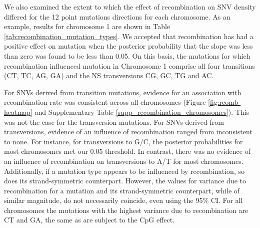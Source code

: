 We also examined the extent to which the effect of recombination on SNV density differed for the 12 point mutations directions for each chromosome. As an example, results for chromosome 1 are shown in Table \ref{tab:recombination_mutation_types}. We accepted that recombination has had a positive effect on mutation when the posterior probability that the slope was less than zero was found to be less than 0.05. On this basis, the mutations for which recombination influenced mutation in Chromosome 1 comprise all four transitions 
(C\textrightarrow T, T\textrightarrow C, A\textrightarrow G, G\textrightarrow A) and the N\textrightarrow S transversions C\textrightarrow G, G\textrightarrow C, T\textrightarrow G and A\textrightarrow C.

For SNVs derived from transition mutations, evidence for an association with recombination rate was consistent across all chromosomes (Figure \ref{fig:rcomb-heatmap} and Supplementary Table \ref{supp_recombination_chromosomes}). This was not the case for the transversion mutations. For SNVs derived from transversions, evidence of an influence of recombination ranged from inconsistent to none. For instance, for transversions to G/C, the posterior probabilities for most chromosomes met our 0.05 threshold. In contrast, there was no evidence of an influence of recombination on transversions to A/T for most chromosomes. Additionally, if a mutation type appears to be influenced by recombination, so does its strand-symmetric counterpart. However, the values for variance due to recombination for a mutation and its strand-symmetric counterpart, while of similar magnitude, do not necessarily coincide, even using the 95\% CI. For all chromosomes the mutations with the highest variance due to recombination are C\textrightarrow T and G\textrightarrow A, the same as are subject to the CpG effect.

